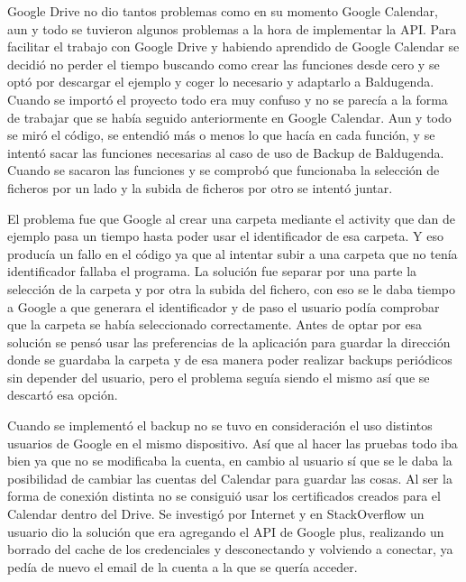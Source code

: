 Google Drive no dio tantos problemas como en su momento Google Calendar, aun y todo se tuvieron algunos problemas a la hora de implementar la API.
Para facilitar el trabajo con Google Drive y habiendo aprendido de Google Calendar se decidió no perder el tiempo buscando como crear las funciones desde cero y se optó por descargar el ejemplo y coger lo necesario y adaptarlo a Baldugenda.
Cuando se importó el proyecto todo era muy confuso y no se parecía a la forma de trabajar que se había seguido anteriormente en Google Calendar.
Aun y todo se miró el código, se entendió más o menos lo que hacía en cada función,  y se intentó sacar las funciones necesarias al caso de uso de Backup de Baldugenda.
Cuando se sacaron las funciones y se comprobó que funcionaba la selección de ficheros por un lado y la subida de ficheros por otro se intentó juntar.

El problema fue que Google al crear una carpeta mediante el activity que dan de ejemplo pasa un tiempo hasta poder usar el identificador de esa carpeta. Y eso producía un fallo en el código ya que al intentar subir a una carpeta que no tenía identificador fallaba el programa.
La solución fue separar por una parte la selección de la carpeta y por otra la subida del fichero, con eso se le daba tiempo a Google a que generara el identificador y de paso el usuario podía comprobar que la carpeta se había seleccionado correctamente.
Antes de optar por esa solución se pensó usar las preferencias de la aplicación para guardar la dirección donde se guardaba la carpeta y de esa manera poder realizar backups periódicos sin depender del usuario, pero el problema seguía siendo el mismo así que se descartó esa opción.

Cuando se implementó el backup no se tuvo en consideración el uso distintos usuarios de Google en el mismo dispositivo. Así que al hacer las pruebas todo iba bien ya que no se modificaba la cuenta, en cambio al usuario sí que se le daba la posibilidad de cambiar las cuentas del Calendar para guardar las cosas. Al ser la forma de conexión distinta no se consiguió usar los certificados creados para el Calendar dentro del Drive.
Se investigó por Internet y en StackOverflow un usuario dio la solución que era agregando el API de Google plus, realizando un borrado del cache de los credenciales y desconectando y volviendo a conectar, ya pedía de nuevo el email de la cuenta a la que se quería acceder.

